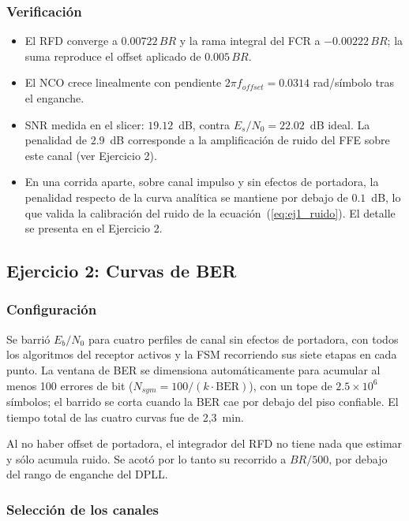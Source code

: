 \subsubsection*{Verificación}
\begin{itemize}\itemsep2pt
\item El RFD converge a $0.00722\,BR$ y la rama integral del FCR a
      $-0.00222\,BR$; la suma reproduce el offset aplicado de $0.005\,BR$.
\item El NCO crece linealmente con pendiente $2\pi f_{offset} = 0.0314$
      rad/símbolo tras el enganche.
\item SNR medida en el slicer: $19.12$~dB, contra
      $E_s/N_0 = 22.02$~dB ideal. La penalidad de $2.9$~dB corresponde a la
      amplificación de ruido del FFE sobre este canal (ver Ejercicio 2).
\item En una corrida aparte, sobre canal impulso y sin efectos de portadora,
      la penalidad respecto de la curva analítica se mantiene por debajo de
      $0.1$~dB, lo que valida la calibración del ruido de la
      ecuación~(\ref{eq:ej1_ruido}). El detalle se presenta en el Ejercicio 2.
\end{itemize}
\subsection*{Ejercicio 2: Curvas de BER}
 
\subsubsection*{Configuración}
 
Se barrió $E_b/N_0$ para cuatro perfiles de canal sin efectos de portadora,
con todos los algoritmos del receptor activos y la FSM recorriendo sus siete
etapas en cada punto. La ventana de BER se dimensiona automáticamente para
acumular al menos 100 errores de bit ($N_{sym} = 100/(k\cdot\mathrm{BER})$),
con un tope de $2.5\times10^{6}$ símbolos; el barrido se corta cuando la BER
cae por debajo del piso confiable. El tiempo total de las cuatro curvas fue de
2,3~min.
 
Al no haber offset de portadora, el integrador del RFD no tiene nada que
estimar y sólo acumula ruido. Se acotó por lo tanto su recorrido a $BR/500$,
por debajo del rango de enganche del DPLL.
 
\subsubsection*{Selección de los canales}
 
